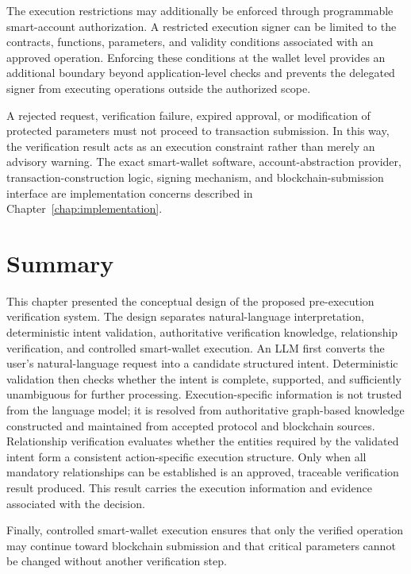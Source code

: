 The execution restrictions may additionally be enforced through
programmable smart-account authorization. A restricted execution
signer can be limited to the contracts, functions, parameters,
and validity conditions associated with an approved operation.
Enforcing these conditions at the wallet level provides an
additional boundary beyond application-level checks and prevents
the delegated signer from executing operations outside the
authorized scope.


A rejected request, verification failure, expired approval, or modification
of protected parameters must not proceed to transaction submission. In this
way, the verification result acts as an execution constraint rather than
merely an advisory warning. The exact smart-wallet software,
account-abstraction provider, transaction-construction logic, signing
mechanism, and blockchain-submission interface are implementation concerns
described in Chapter~\ref{chap:implementation}.


\section{Summary}
\label{sec:concept_summary}

This chapter presented the conceptual design of the proposed pre-execution
verification system. The design separates natural-language interpretation,
deterministic intent validation, authoritative verification knowledge,
relationship verification, and controlled smart-wallet execution. An LLM first converts the user's natural-language request into a candidate
structured intent. Deterministic validation then checks whether the intent is
complete, supported, and sufficiently unambiguous for further processing.
Execution-specific information is not trusted from the language model; it is
resolved from authoritative graph-based knowledge constructed and maintained
from accepted protocol and blockchain sources. Relationship verification evaluates whether the entities required by the
validated intent form a consistent action-specific execution structure. Only
when all mandatory relationships can be established is an approved,
traceable verification result produced. This result carries the execution
information and evidence associated with the decision.

Finally, controlled smart-wallet execution ensures that only the verified
operation may continue toward blockchain submission and that critical
parameters cannot be changed without another verification step.

